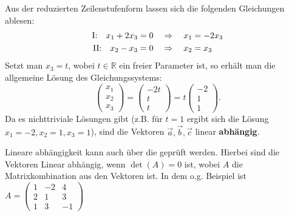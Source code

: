 Aus der reduzierten Zeilenstufenform lassen sich die folgenden Gleichungen ablesen:
\begin{align*}
    \text{I:\@} \quad x_1 + 2x_3 &= 0 \quad \Rightarrow \quad x_1 = -2x_3 \\
    \text{II:\@} \quad x_2 - x_3 &= 0 \quad \Rightarrow \quad x_2 = x_3
\end{align*}
Setzt man $x_3 = t$, wobei $t \in \mathbb{R}$ ein freier Parameter ist, so erhält man die allgemeine Lösung des Gleichungssystems:
\[
    \begin{pmatrix} x_1 \\ x_2 \\ x_3 \end{pmatrix} = \begin{pmatrix} -2t \\ t \\ t \end{pmatrix} = t \begin{pmatrix} -2 \\ 1 \\ 1 \end{pmatrix}.
\]
Da es nichttriviale Lösungen gibt (z.B. für $t=1$ ergibt sich die Lösung $x_1=-2, x_2=1, x_3=1$), sind die Vektoren $\vec{a}, \vec{b}, \vec{c}$ linear \textbf{abhängig}.

Lineare abhängigkeit kann auch über die  geprüft werden. Hierbei sind die Vektoren Linear abhängig, wenn $\det(A) = 0$ ist, wobei $A$ die Matrixkombination aus den Vektoren ist. In dem o.g. Beispiel ist $A = \begin{pmatrix}
    1 & -2 & 4 \\
    2 & 1 & 3 \\
    1 & 3 & -1
\end{pmatrix}$